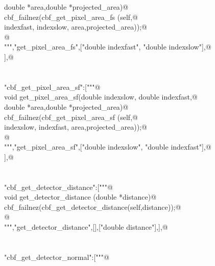 \documentclass[10pt,a4paper,twoside,notitlepage]{article}
\begin{document}
\begin{flushleft}
\begin{minipage}{\linewidth}
\begin{list}{}{}
\mbox{}\verb@                        double *area,double *projected_area){@\\
\mbox{}\verb@       cbf_failnez(cbf_get_pixel_area_fs (self,@\\
\mbox{}\verb@                                       indexfast, indexslow, area,projected_area));@\\
\mbox{}\verb@      }@\\
\mbox{}\verb@""","get_pixel_area_fs",["double indexfast", "double indexslow"],@\\
\mbox{} ],@\\
\mbox{}\verb@@\\
\mbox{}\verb@@\\
\mbox{}\verb@"cbf_get_pixel_area_sf":["""@\\
\mbox{}\verb@%apply double *OUTPUT{double *area,double *projected_area};@\\
\mbox{}\verb@    void get_pixel_area_sf(double indexslow, double indexfast,@\\
\mbox{}\verb@                        double *area,double *projected_area){@\\
\mbox{}\verb@       cbf_failnez(cbf_get_pixel_area_sf (self,@\\
\mbox{}\verb@                                       indexslow, indexfast, area,projected_area));@\\
\mbox{}\verb@      }@\\
\mbox{}\verb@""","get_pixel_area_sf",["double indexslow", "double indexfast"],@\\
\mbox{} ],@\\
\mbox{}\verb@@\\
\mbox{}\verb@@\\
\mbox{}\verb@"cbf_get_detector_distance":["""@\\
\mbox{}\verb@%apply double *OUTPUT {double *distance};@\\
\mbox{}\verb@ void get_detector_distance (double *distance){@\\
\mbox{}\verb@  cbf_failnez(cbf_get_detector_distance(self,distance));@\\
\mbox{}\verb@  }@\\
\mbox{}\verb@""","get_detector_distance",[],["double distance"],],@\\
\mbox{}\verb@@\\
\mbox{}\verb@@\\
\mbox{}\verb@"cbf_get_detector_normal":["""@\\

\end{list}
\end{minipage}
\end{flushleft}
\end{document}
